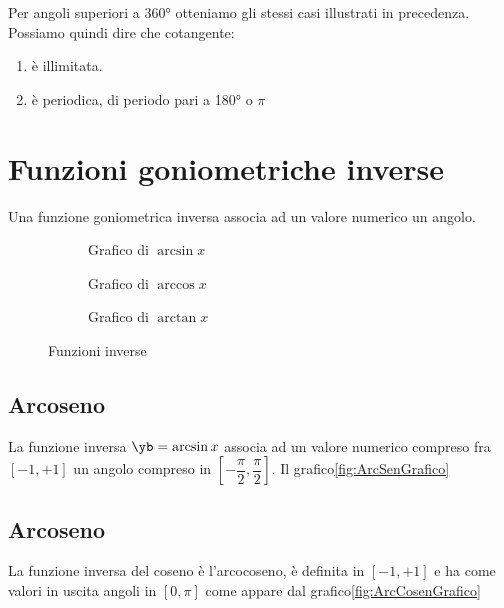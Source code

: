 Per angoli superiori a \ang{360} otteniamo gli stessi casi illustrati in precedenza. 
Possiamo quindi dire che cotangente:
\begin{enumerate}
	\item è illimitata.
	\item è periodica, di periodo pari a \ang{180} o $\pi$
\end{enumerate} 
\begin{figure}
	\centering
	
	\label{fig:AndamentoCotangente2}
\end{figure}%
\section{Funzioni goniometriche inverse}
Una funzione goniometrica inversa associa ad un valore numerico un angolo.
\begin{figure}
	\begin{subfigure}[b]{.5\linewidth}
		\centering
	
		\caption{Grafico di $\arcsin x$}
			\label{fig:ArcSenGrafico}
	\end{subfigure}%
	\begin{subfigure}[b]{.5\linewidth}
		\centering
	
		\caption{Grafico di $\arccos x$}
		\label{fig:ArcCosenGrafico}
	\end{subfigure}
		\begin{subfigure}[b]{\linewidth}
			\centering
	
		\caption{Grafico di $\arctan x$}
		\label{fig:ArcTangenteGrafico}
		\end{subfigure}
			\caption{Funzioni inverse}
	\label{tab:funzinverse_1}
\end{figure}
\subsection{Arcoseno}
La funzione inversa $\yb=\arcsin x$ associa ad un valore numerico compreso fra$[-1,+1]$ un angolo compreso in $[-\dfrac{\pi}{2},\dfrac{\pi}{2}]$. Il grafico\nobs\vref{fig:ArcSenGrafico} 
\subsection{Arcoseno}
La funzione inversa del coseno è l'arcocoseno, è definita  in $[-1,+1]$ e ha come valori in uscita angoli in $[0,\pi]$ come appare dal grafico\nobs\vref{fig:ArcCosenGrafico} 
